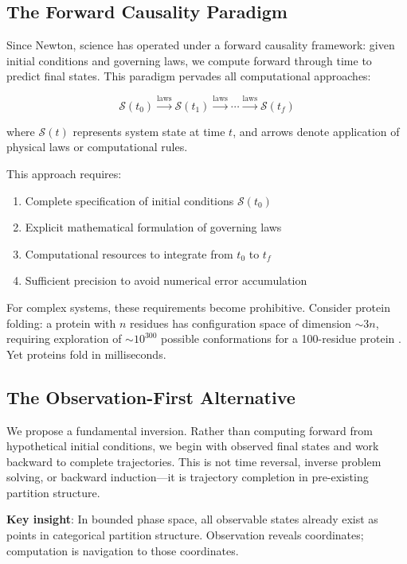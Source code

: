 \documentclass[twocolumn,10pt]{article}
\begin{document}
\subsection{The Forward Causality Paradigm}

Since Newton, science has operated under a forward causality framework: given initial conditions and governing laws, we compute forward through time to predict final states. This paradigm pervades all computational approaches:

\begin{equation}
\mathcal{S}(t_0) \xrightarrow{\text{laws}} \mathcal{S}(t_1) \xrightarrow{\text{laws}} \cdots \xrightarrow{\text{laws}} \mathcal{S}(t_f)
\end{equation}

where $\mathcal{S}(t)$ represents system state at time $t$, and arrows denote application of physical laws or computational rules.

This approach requires:
\begin{enumerate}
\item Complete specification of initial conditions $\mathcal{S}(t_0)$
\item Explicit mathematical formulation of governing laws
\item Computational resources to integrate from $t_0$ to $t_f$
\item Sufficient precision to avoid numerical error accumulation
\end{enumerate}

For complex systems, these requirements become prohibitive. Consider protein folding: a protein with $n$ residues has configuration space of dimension $\sim 3n$, requiring exploration of $\sim 10^{300}$ possible conformations for a 100-residue protein \cite{Levinthal1969}. Yet proteins fold in milliseconds.

\subsection{The Observation-First Alternative}

We propose a fundamental inversion. Rather than computing forward from hypothetical initial conditions, we begin with observed final states and work backward to complete trajectories. This is not time reversal, inverse problem solving, or backward induction—it is trajectory completion in pre-existing partition structure.

\textbf{Key insight}: In bounded phase space, all observable states already exist as points in categorical partition structure. Observation reveals coordinates; computation is navigation to those coordinates.
\end{document}
